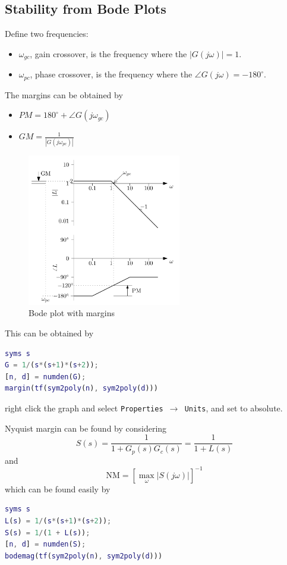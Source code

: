\documentclass[letterpaper,12pt]{article}
\begin{document}
\subsection{Stability from Bode Plots}
Define two frequencies:
\begin{itemize}
    \item $\omega_{gc}$, gain crossover, is the frequency where the $|G(j\omega)| = 1$.
    \item $\omega_{pc}$, phase crossover, is the frequency where the $\angle G(j\omega) = -180^{\circ}$.
\end{itemize}
The margins can be obtained by
\begin{itemize}
    \item $PM = 180^{\circ} + \angle G(j\omega_{gc})$
    \item $GM = \frac{1}{|G(j\omega_{pc})|}$
\end{itemize}
\begin{figure}[h]
    \centering
    \includegraphics[width=0.6\textwidth]{bode stability diagram.png}
    \caption{Bode plot with margins}
\end{figure}
This can be obtained by
\begin{lstlisting}[language=Matlab]
syms s
G = 1/(s*(s+1)*(s+2));
[n, d] = numden(G);
margin(tf(sym2poly(n), sym2poly(d)))
\end{lstlisting}
right click the graph and select \texttt{Properties $\rightarrow$ Units}, and set to absolute. 

Nyquist margin can be found by considering
\begin{equation*}
    S(s) = \frac{1}{1 + G_p(s) G_c(s)} = \frac{1}{1 + L(s)}
\end{equation*}
and 
\begin{equation*}
    \text{NM} = [\max_{\omega} |S(j\omega)|]^{-1}
\end{equation*}
which can be found easily by
\begin{lstlisting}[language=Matlab]
syms s
L(s) = 1/(s*(s+1)*(s+2));
S(s) = 1/(1 + L(s));
[n, d] = numden(S);
bodemag(tf(sym2poly(n), sym2poly(d)))
\end{lstlisting}
\end{document}
